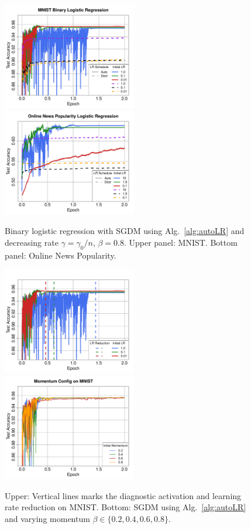 \documentclass[conference]{IEEEtran}
\begin{document}
\begin{figure}[t]
\begin{center}
  \includegraphics[width=2.3in]{fig/mnist_binary.pdf}
\includegraphics[width=2.3in]{fig/news_popularity.pdf}
\end{center}
\vspace{-0.16in}
  \caption{Binary logistic regression  with SGDM using Alg.~\ref{alg:autoLR} and decreasing rate $\gamma = \gamma_0 / n$,
  $\beta = 0.8$. Upper panel: MNIST. Bottom panel: Online News Popularity.
  }
\label{fig:mnist_news_binary}\vspace{-0.13in}
\end{figure}


\begin{figure}[h!]
\begin{center}
  \includegraphics[width=2.3in]{fig/RFig1_LR_notitle.pdf}
\includegraphics[width=2.3in]{fig/RFig2_AltMom.pdf}
\end{center}
\vspace{-0.16in}
  \caption{Upper: Vertical lines marks the diagnostic activation and learning rate reduction on MNIST.
  Bottom: SGDM using Alg.~\ref{alg:autoLR} and varying momentum $\beta\in\{0.2, 0.4, 0.6, 0.8\}$.
  }
\label{fig:mnistactivate_momvary}\vspace{-0.12in}
\end{figure}
\end{document}
